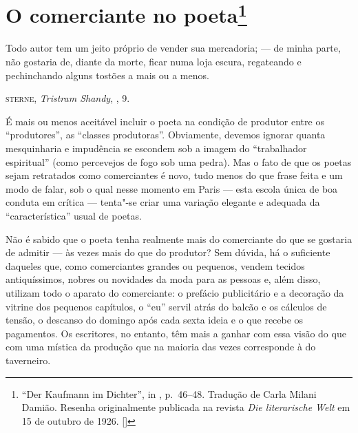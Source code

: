 \chapter{O comerciante no poeta\footnote[*]{``Der Kaufmann im Dichter'', in  , p.~46--48. Tradução de Carla Milani Damião. Resenha originalmente publicada na revista \emph{Die literarische Welt} em 15 de outubro de 1926. []}}

\epigraph{Todo autor tem um jeito próprio de vender sua mercadoria; --- de minha
parte, não gostaria de, diante da morte, ficar numa loja escura,
regateando e pechinchando alguns tostões a mais ou a menos.}{\textsc{sterne}, \emph{Tristram Shandy}, , 9.\footnotemark}


É mais ou menos aceitável incluir o poeta na condição de produtor entre
os ``produtores'', as ``classes produtoras''. Obviamente, devemos ignorar
quanta mesquinharia e impudência se escondem sob a imagem do
``trabalhador espiritual'' (como percevejos de fogo sob uma pedra). Mas o
fato de que os poetas sejam retratados como comerciantes é novo, tudo
menos do que frase feita e um modo de falar, sob o qual nesse momento em
Paris --- esta escola única de boa conduta em crítica --- tenta"-se criar
uma variação elegante e adequada da ``característica'' usual de poetas.

Não é sabido que o poeta tenha realmente mais do comerciante do que se
gostaria de admitir --- às vezes mais do que do produtor? Sem dúvida, há o
suficiente daqueles que, como comerciantes grandes ou pequenos, vendem
tecidos antiquíssimos, nobres ou novidades da moda para as pessoas e,
além disso, utilizam todo o aparato do comerciante: o prefácio
publicitário e a decoração da vitrine dos pequenos capítulos, o ``eu''
servil atrás do balcão e os cálculos de tensão, o descanso do domingo
após cada sexta ideia e o que recebe os pagamentos. Os escritores, no
entanto, têm mais a ganhar com essa visão do que com uma mística da
produção que na maioria das vezes corresponde à do taverneiro.

